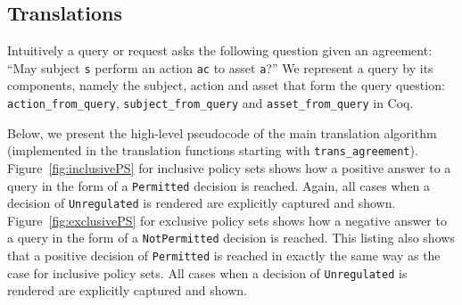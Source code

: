 \documentclass[conference]{IEEEtran}
\newcommand{\syn}{\texttt}
\begin{document}
\subsection{Translations}\label{sec:translationfuncs}

Intuitively a query or request asks the following question given an agreement: ``May subject \syn{s} perform an action \syn{ac} to asset \syn{a}?'' We represent a query by its components, namely the subject, action and asset that form the query question: \syn{action_from_query}, \syn{subject_from_query} and \syn{asset_from_query} in Coq. 

 
Below, we present the high-level pseudocode of the main translation algorithm (implemented in the translation functions starting with \syn{trans_agreement}).
%
Figure~\ref{fig:inclusivePS} for inclusive policy sets shows how a positive answer to a query in the form of a \syn{Permitted} decision is reached. Again, all cases when a decision of \syn{Unregulated} is rendered are explicitly captured and shown. Figure~\ref{fig:exclusivePS} for exclusive policy sets shows how a negative answer to a query in the form of a \syn{NotPermitted} decision is reached. This listing also shows that a positive decision of \syn{Permitted} is reached in exactly the same way as the case for inclusive policy sets. All cases when a decision of \syn{Unregulated} is rendered are explicitly captured and shown.
\end{document}
